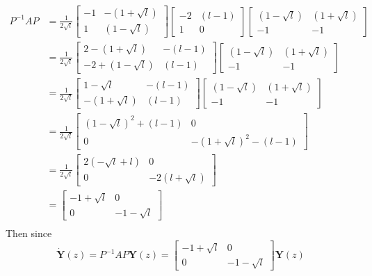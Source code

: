 \documentclass{article}	%
\theoremstyle{definition}
\begin{document}
\begin{align*}
P^{-1}AP &= 
\frac{1}{2\sqrt{l}}
\begin{bmatrix}
-1	&	-(1+\sqrt{l})	\\
1	&	(1-\sqrt{l})
\end{bmatrix}
\begin{bmatrix}
-2		&	(l-1)	\\
1		&	0
\end{bmatrix}
\begin{bmatrix}
(1-\sqrt{l})	&	(1+\sqrt{l})	\\
-1				&	-1
\end{bmatrix}
\\
&= 
\frac{1}{2\sqrt{l}}
\begin{bmatrix}
2-(1+\sqrt{l})	&	-(l-1)	\\
-2+(1-\sqrt{l})	&	(l-1)
\end{bmatrix}
\begin{bmatrix}
(1-\sqrt{l})	&	(1+\sqrt{l})	\\
-1				&	-1
\end{bmatrix}
\\
&= 
\frac{1}{2\sqrt{l}}
\begin{bmatrix}
1-\sqrt{l}	&	-(l-1)	\\
-(1+\sqrt{l})	&	(l-1)
\end{bmatrix}
\begin{bmatrix}
(1-\sqrt{l})	&	(1+\sqrt{l})	\\
-1				&	-1
\end{bmatrix}
\\
&= 
\frac{1}{2\sqrt{l}}
\begin{bmatrix}
(1-\sqrt{l})^{2}+(l-1)	&	0	\\
0						&	-(1+\sqrt{l})^{2}-(l-1)
\end{bmatrix}
\\
&= 
\frac{1}{2\sqrt{l}}
\begin{bmatrix}
2(-\sqrt{l}+l)	&	0	\\
0						&	-2(l+\sqrt{l})
\end{bmatrix}
\\
&= 
\begin{bmatrix}
-1+\sqrt{l}	&	0	\\
0						&	-1-\sqrt{l}
\end{bmatrix}
\\
\end{align*}
Then since 
\[ \dot{\mathbf{Y}}(z) = P^{-1}AP \mathbf{Y}(z) = \begin{bmatrix}
-1+\sqrt{l}	&	0	\\
0			&	-1-\sqrt{l}
\end{bmatrix} 
\mathbf{Y}(z)
\]
\end{document}
